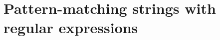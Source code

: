 

\newcommand{\anglequote}[1]{{$<\!\!<$}#1$>\!\!>$}


%
%


\chapter{Pattern-matching strings with regular expressions}
\label{chapt:sre}

